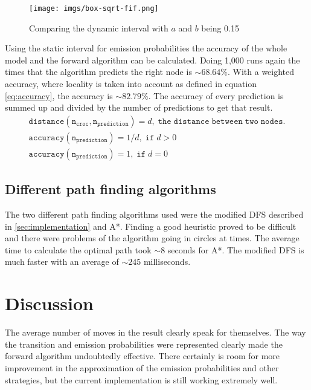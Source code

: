 \documentclass[12pt, a4paper]{article}
\begin{document}
\begin{figure}[!ht]\label{fig:box-sqrt-fif.png}
\centering
\texttt{[image: imgs/box-sqrt-fif.png]}\\
\caption{Comparing the dynamic interval with $a$ and $b$ being 0.15}
\end{figure}

Using the static interval for emission probabilities the accuracy of the whole model and the forward algorithm can be calculated. Doing 1,000 runs again the times that the algorithm predicts the right node is $\sim68.64\%$. With a weighted accuracy, where locality is taken into account as defined in equation \ref{eq:accuracy}, the accuracy is $\sim82.79\%$. The accuracy of every prediction is summed up and divided by the number of predictions to get that result.
\begin{equation}\label{eq:accuracy}
\begin{split}
\mathtt{distance(n_{croc}, n_{prediction})}=d, \; \mathtt{the \; distance \; between \; two \; nodes.}
\\
\mathtt{accuracy(n_{prediction})} = 1 / d, \; \mathtt{if} \; d > 0 \hspace{151pt}
\\
\mathtt{accuracy(n_{prediction})} = 1, \; \mathtt{if} \; d = 0 \hspace{163pt}
\end{split}
\end{equation}

\subsection{Different path finding algorithms}

The two different path finding algorithms used were the modified DFS described in \ref{sec:implementation} and A*. Finding a good heuristic proved to be difficult and there were problems of the algorithm going in circles at times. The average time to calculate the optimal path took $\sim8$ seconds for A*. The modified DFS is much faster with an average of $\sim245$ milliseconds.


\section{Discussion}

The average number of moves in the result clearly speak for themselves. The way the transition and emission probabilities were represented clearly made the forward algorithm undoubtedly effective. There certainly is room for more improvement in the approximation of the emission probabilities and other strategies, but the current implementation is still working extremely well.
\end{document}
